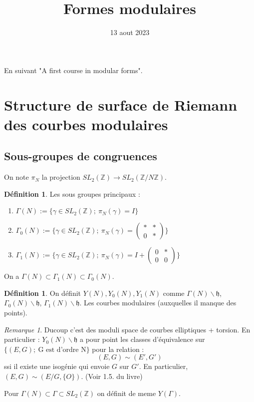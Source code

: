 \documentclass[12pt]{article}
\title{Formes modulaires}
\date{13 aout 2023}
\theoremstyle{plain}
\theoremstyle{definition}
\newtheorem{defn}[subsubsection]{D\'efinition}
\theoremstyle{remark}
\newtheorem{rem}{Remarque}
\newcommand{\Z}{\mathbb{Z}}
\newcommand{\h}{\mathfrak{h}}
\begin{document}
\tableofcontents
\maketitle

En suivant "A first course in modular forms".
\section{Structure de surface de Riemann des courbes modulaires}
\subsection{Sous-groupes de congruences}
On note $\pi_N$ la projection $SL_2(\Z)\rightarrow SL_2(\Z/N\Z)$.
\begin{defn}
Les sous groupes principaux :
\begin{enumerate}
    \item $\Gamma(N):=\{\gamma\in SL_2(\Z);~\pi_N(\gamma)=I\}$
    \item $\Gamma_0(N):=\{\gamma\in SL_2(\Z);~\pi_N(\gamma)=\begin{pmatrix}*&*\\ 0&* \end{pmatrix}\}$
    \item $\Gamma_1(N):=\{\gamma\in SL_2(\Z);~\pi_N(\gamma)=I+\begin{pmatrix}0&*\\ 0&0 \end{pmatrix}\}$
\end{enumerate}
On a $\Gamma(N)\subset \Gamma_1(N)\subset \Gamma_0(N)$. 
\end{defn}

\begin{defn}
    On définit $Y(N),Y_0(N),Y_1(N)$ comme $\Gamma(N)\backslash\h$, $\Gamma_0(N)\backslash\h$, $\Gamma_1(N)\backslash\h$. 
    Les courbes modulaires (auxquelles il manque des points).
\end{defn}

\begin{rem}
    Ducoup c'est des moduli space de courbes elliptiques + torsion. En particulier : $Y_0(N)\backslash \h$ a pour point 
    les classes d'équivalence sur $\{(E,G);~\text{G est d'ordre N}\}$ pour la relation : $$(E,G)\sim(E',G')$$ ssi il existe une isogénie qui envoie 
    $G$ sur $G'$. En particulier, $(E,G)\sim (E/G, \{O\})$. (Voir 1.5. du livre)
\end{rem}

Pour $\Gamma(N)\subset\Gamma\subset SL_2(\Z)$ on définit de meme $Y(\Gamma)$.
\end{document}
